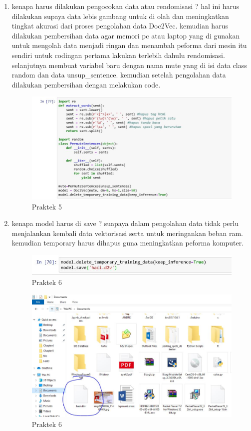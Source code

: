 \begin{enumerate}
\item kenapa harus dilakukan pengocokan data atau rendomisasi ? hal ini harus dilakukan supaya data lebis gambang untuk di olah dan meningkatkan tingkat akurasi dari proses pengolahan data Doc2Vec. kemudian harus dilakukan pembersihan data agar memori pc atau laptop yang di gunakan untuk mengolah data menjadi ringan dan menambah peforma dari mesin itu sendiri untuk codingan pertama lakukan terlebih dahulu rendomisasi. selanjutnya membuat variabel baru dengan nama mute yang di isi data class random dan data unsup\_sentence. kemudian setelah pengolahan data dilakukan pembersihan dengan melakukan code.
\begin{figure}[ht]
\centering
\includegraphics[scale=0.6]{figures/1174042/chapter5/2,5.JPG}
\caption{Praktek 5}
\label{contoh}
\end{figure}

\item kenapa model harus di save ? suapaya dalam pengolahan data tidak perlu menjalankan kembali data vektorisasi serta untuk meringankan beban ram. kemudian temporary harus dihapus guna meningkatkan peforma komputer.
\begin{figure}[ht]
\centering
\includegraphics[scale=0.6]{figures/1174042/chapter5/2,6.JPG}
\caption{Praktek 6}
\label{contoh}
\end{figure}
\begin{figure}[ht]
\centering
\includegraphics[scale=0.6]{figures/1174042/chapter5/2,6,1.JPG}
\caption{Praktek 6}
\label{contoh}
\end{figure}


\end{enumerate}
